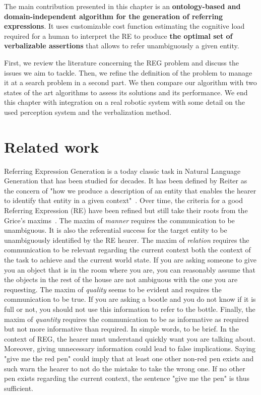 The main contribution presented in this chapter is an \textbf{ontology-based and domain-independent algorithm for the generation of referring expressions}. It uses customizable cost function estimating the cognitive load required for a human to interpret the RE to produce \textbf{the optimal set of verbalizable assertions} that allows to refer unambiguously a given entity.

First, we review the literature concerning the REG problem and discuss the issues we aim to tackle. Then, we refine the definition of the problem to manage it at a search problem in a second part. We then compare our algorithm with two states of the art algorithms to assess its solutions and its performance. We end this chapter with integration on a real robotic system with some detail on the used perception system and the verbalization method.

\section{Related work}

Referring Expression Generation is a today classic task in Natural Language Generation \cite{gatt_2018_survey} that has been studied for decades. It has been defined by Reiter as the concern of "how we produce a description of an entity that enables the hearer to identify that entity in a given context"~\cite{reiter_2000_building}. Over time, the criteria for a good Referring Expression (RE) have been refined but still take their roots from the Grice's maxims~\cite{grice_1975_logic}. The maxim of \textit{manner} requires the communication to be unambiguous. It is also the referential success for the target entity to be unambiguously identified by the RE hearer. The maxim of \textit{relation} requires the communication to be relevant regarding the current context both the context of the task to achieve and the current world state. If you are asking someone to give you an object that is in the room where you are, you can reasonably assume that the objects in the rest of the house are not ambiguous with the one you are requesting. The maxim of \textit{quality} seems to be evident and requires the communication to be true. If you are asking a bootle and you do not know if it is full or not, you should not use this information to refer to the bottle. Finally, the maxim of \textit{quantity} requires the communication to be as informative as required but not more informative than required. In simple words, to be brief. In the context of REG, the hearer must understand quickly want you are talking about. Moreover, giving unnecessary information could lead to false implications. Saying "give me the red pen" could imply that at least one other non-red pen exists and such warn the hearer to not do the mistake to take the wrong one. If no other pen exists regarding the current context, the sentence "give me the pen" is thus sufficient.

